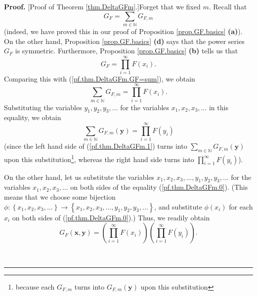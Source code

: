 \documentclass[numbers=enddot,12pt,final,onecolumn,notitlepage]{scrartcl}%
\theoremstyle{definition}
\newenvironment{proof}[1][Proof]{\noindent\textbf{#1.} }{\ \rule{0.5em}{0.5em}}
\let\sumnonlimits\sum
\let\prodnonlimits\prod
\renewcommand{\sum}{\sumnonlimits\limits}
\renewcommand{\prod}{\prodnonlimits\limits}
\newenvironment{verlong}{}{}
\begin{document}
\begin{verlong}
\begin{proof}
[Proof of Theorem \ref{thm.DeltaGFm}.]Forget that we fixed $m$. Recall that
\begin{equation}
G_{F}=\sum_{m\in\mathbb{N}}G_{F,m} \label{pf.thm.DeltaGFm.GF=sum}%
\end{equation}
(indeed, we have proved this in our proof of Proposition \ref{prop.GF.basics}
\textbf{(a)}). On the other hand, Proposition \ref{prop.GF.basics}
\textbf{(d)} says that the power series $G_{F}$ is symmetric. Furthermore,
Proposition \ref{prop.GF.basics} \textbf{(b)} tells us that
\begin{equation}
G_{F}=\prod_{i=1}^{\infty}F\left(  x_{i}\right)  . \label{pf.thm.DeltaGFm.0}%
\end{equation}
Comparing this with (\ref{pf.thm.DeltaGFm.GF=sum}), we obtain%
\begin{equation}
\sum_{m\in\mathbb{N}}G_{F,m}=\prod_{i=1}^{\infty}F\left(  x_{i}\right)  .
\label{pf.thm.DeltaGFm.1}%
\end{equation}
Substituting the variables $y_{1},y_{2},y_{3},\ldots$ for the variables
$x_{1},x_{2},x_{3},\ldots$ in this equality, we obtain
\begin{equation}
\sum_{m\in\mathbb{N}}G_{F,m}\left(  \mathbf{y}\right)  =\prod_{i=1}^{\infty
}F\left(  y_{i}\right)  \label{pf.thm.DeltaGFm.1y}%
\end{equation}
(since the left hand side of (\ref{pf.thm.DeltaGFm.1}) turns into $\sum
_{m\in\mathbb{N}}G_{F,m}\left(  \mathbf{y}\right)  $ upon this
substitution\footnote{because each $G_{F,m}$ turns into $G_{F,m}\left(
\mathbf{y}\right)  $ upon this substitution}, whereas the right hand side
turns into $\prod_{i=1}^{\infty}F\left(  y_{i}\right)  $).

On the other hand, let us substitute the variables $x_{1},x_{2},x_{3}%
,\ldots,y_{1},y_{2},y_{3},\ldots$ for the variables $x_{1},x_{2},x_{3},\ldots$
on both sides of the equality (\ref{pf.thm.DeltaGFm.0}). (This means that we
choose some bijection $\phi:\left\{  x_{1},x_{2},x_{3},\ldots\right\}
\rightarrow\left\{  x_{1},x_{2},x_{3},\ldots,y_{1},y_{2},y_{3},\ldots\right\}
$, and substitute $\phi\left(  x_{i}\right)  $ for each $x_{i}$ on both sides
of (\ref{pf.thm.DeltaGFm.0}).) Thus, we readily obtain%
\begin{equation}
G_{F}\left(  \mathbf{x},\mathbf{y}\right)  =\left(  \prod_{i=1}^{\infty
}F\left(  x_{i}\right)  \right)  \left(  \prod_{i=1}^{\infty}F\left(
y_{i}\right)  \right)  . \label{pf.thm.DeltaGFm.1xy}%
\end{equation}



\end{proof}
\end{verlong}
\end{document}
